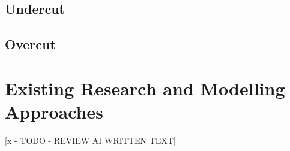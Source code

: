 \subsection{Undercut}
\label{subsec:undercut-background}

%

\subsection{Overcut}
\label{subsec:overcut-background}


\section{Existing Research and Modelling Approaches}
\label{sec:existing-research}

%
%

[x - TODO - REVIEW AI WRITTEN TEXT]

